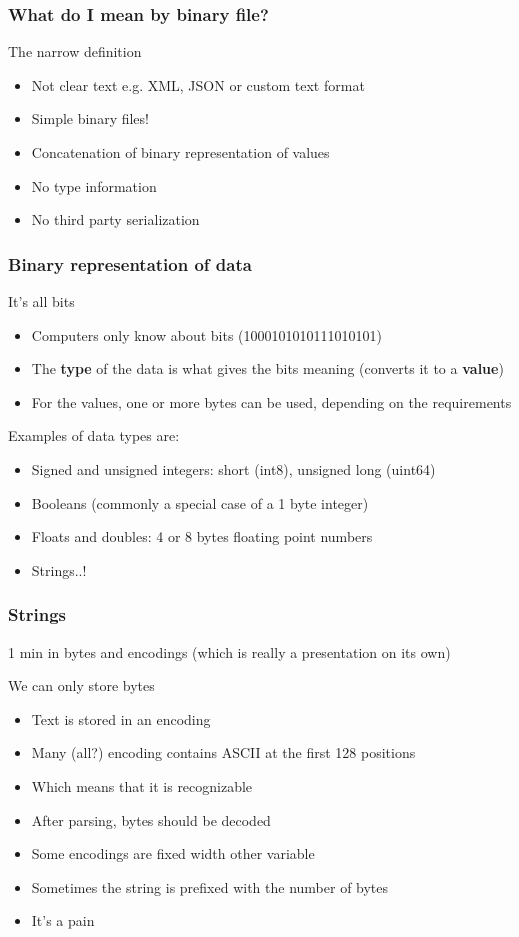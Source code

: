 \documentclass{beamer}
\begin{document}
\begin{frame}
  \frametitle{What do I mean by binary file?}
  \begin{block}{The narrow definition}
    \begin{itemize}
    \item Not clear text e.g. XML, JSON or custom text format
    \item Simple binary files!
    \item Concatenation of binary representation of values
    \item No type information
    \item No third party serialization
    \end{itemize}
  \end{block}
\end{frame}

\begin{frame}
  \frametitle{Binary representation of data}
  \begin{block}{It's all bits}
    \begin{itemize}
    \item Computers only know about bits (1000101010111010101)
    \item The \textbf{type} of the data is what gives the bits meaning (converts it to a \textbf{value})
    \item For the values, one or more bytes can be used, depending on the requirements
    \end{itemize}
  \end{block}
  Examples of data types are:
  \begin{itemize}
  \item Signed and unsigned integers: short (int8), unsigned long (uint64)
  \item Booleans (commonly a special case of a 1 byte integer)
  \item Floats and doubles: 4 or 8 bytes floating point numbers
  \item Strings..!
  \end{itemize}
\end{frame}

\begin{frame}
  \frametitle{Strings}
  1 min in bytes and encodings (which is really a presentation on its own)
  \begin{block}{We can only store bytes}
    \begin{itemize}
    \item Text is stored in an encoding
    \item Many (all?) encoding contains ASCII at the first 128 positions
    \item Which means that it is recognizable
    \item After parsing, bytes should be decoded
    \item Some encodings are fixed width other variable
    \item Sometimes the string is prefixed with the number of bytes
    \item It's a pain
    \end{itemize}
  \end{block}
\end{frame}
\end{document}
